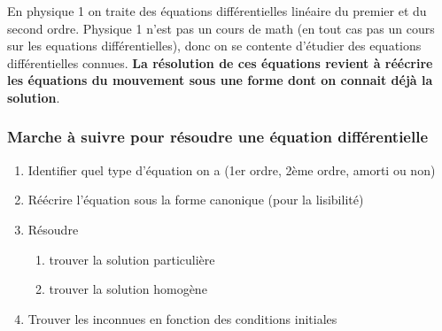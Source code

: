 \begin{multicols}{2}
    En physique 1 on traite des équations différentielles linéaire du premier et du second ordre. Physique 1 n'est pas un cours de math (en tout cas pas un cours sur les equations différentielles), donc on se contente d'étudier des equations différentielles connues. \textbf{La résolution de ces équations revient à réécrire les équations du mouvement sous une forme dont on connait déjà la solution}. 
    
    \subsubsection*{Marche à suivre pour résoudre une équation différentielle}

    \begin{enumerate}
        \item Identifier quel type d'équation on a (1er ordre, 2ème ordre, amorti ou non)
        \item Réécrire l'équation sous la forme canonique (pour la lisibilité)
        \item Résoudre
        \begin{enumerate}
            \item trouver la solution particulière
            \item trouver la solution homogène
        \end{enumerate}
        \item Trouver les inconnues en fonction des conditions initiales
    \end{enumerate}
    



\end{multicols}

